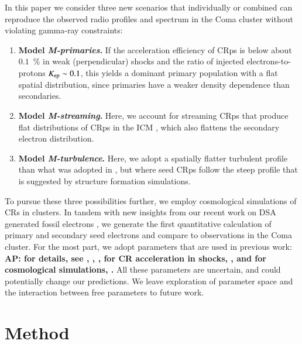 \documentclass[a4paper,fleqn,usenatbib]{mnras}
\def\AP#1{{\bf  AP: #1}}
\begin{document}
In this paper we consider three new scenarios that
individually or combined can reproduce the observed radio profiles and
spectrum in the Coma cluster without violating gamma-ray constraints:
\begin{enumerate}
\item {\bf Model {\em M-primaries}.} If the acceleration efficiency of CRps is below
  about $0.1$~{\%} in weak (perpendicular) shocks and the ratio of injected
  electrons-to-protons $K_{{\mathrm{ep}}} \sim 0.1$, this yields a dominant primary
  population with a flat spatial distribution, since primaries have a weaker
  density dependence than secondaries.
\item {\bf Model {\em M-streaming}.} Here, we account for streaming CRps that
  produce flat distributions of CRps in the ICM
  \citep{ensslin11,wiener13,2014MNRAS.438..124Z}, which also flattens the
  secondary electron distribution.
\item {\bf Model {\em M-turbulence}.} Here, we adopt a spatially
  flatter turbulent profile than what was adopted in \citet{brunetti12},
  but where seed CRps follow the steep profile that is suggested by
  structure formation simulations.
\end{enumerate}

To pursue these three possibilities further, we employ cosmological
simulations of CRs in clusters. In tandem with new insights from our
recent work on DSA generated fossil electrons \citep{pinzke13}, we
generate the first quantitative calculation of primary and secondary
seed electrons and compare to observations in the Coma cluster. For
the most part, we adopt parameters that are used in previous work:
\AP{for details, see \citep[][ turbulent
    spectrum]{brunetti07,brunetti11}, \citep[][ injection scale of
    turbulens]{2015ApJ...800...60M}, \citep[][ energy density of
    turbulence]{2009ApJ...705.1129L,2010ApJ...725.1452S,2011A&A...529A..17V},
  for CR acceleration in shocks, \citep[][ in particular
    $K_{\rmn{ep}}$, acceleration efficiency]{pinzke13}, and for
  cosmological simulations, \citep[][ i.e., shock history, temperature
    profile, density profile, magnetic field profile]{pinzke10}.} All
these parameters are uncertain, and could potentially change our
predictions. We leave exploration of parameter space and the
interaction between free parameters to future work.


\section{Method} 
\end{document}
